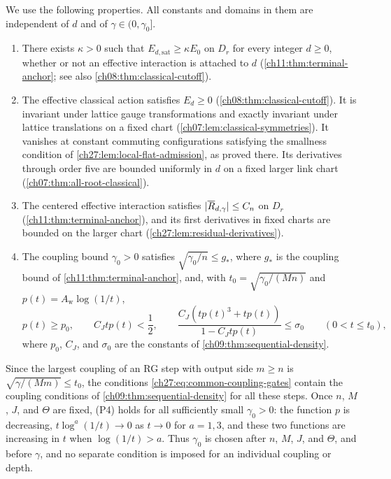 We use the following properties. All constants and domains in them are independent of $d$ and of $\gamma\in(0,\gamma_0]$.
\begin{enumerate}
\item[(P1)] There exists $\kappa>0$ such that $E_{d,\mathrm{sat}}\ge\kappa E_0$ on $D_r$ for every integer $d\ge0$, whether or not an effective interaction is attached to $d$ (\cref{ch11:thm:terminal-anchor}; see also \cref{ch08:thm:classical-cutoff}).
\item[(P2)] The effective classical action satisfies $E_d\ge0$ (\cref{ch08:thm:classical-cutoff}). It is invariant under lattice gauge transformations and exactly invariant under lattice translations on a fixed chart (\cref{ch07:lem:classical-symmetries}). It vanishes at constant commuting configurations satisfying the smallness condition of \cref{ch27:lem:local-flat-admission}, as proved there. Its derivatives through order five are bounded uniformly in $d$ on a fixed larger link chart (\cref{ch07:thm:all-root-classical}).
\item[(P3)] The centered effective interaction satisfies $\lvert \overline R_{d,\gamma}\rvert\le C_n$ on $D_r$ (\cref{ch11:thm:terminal-anchor}), and its first derivatives in fixed charts are bounded on the larger chart (\cref{ch27:lem:residual-derivatives}).
\item[(P4)] The coupling bound $\gamma_0>0$ satisfies $\sqrt{\gamma_0/n}\le g_*$, where $g_*$ is the coupling bound of \cref{ch11:thm:terminal-anchor}, and, with $t_0=\sqrt{\gamma_0/(Mn)}$ and $p(t)=A_{\mathrm w}\log(1/t)$,
\begin{equation}\label{ch27:eq:common-coupling-gates}
 p(t)\ge p_0,\qquad C_Jtp(t)<\frac12,\qquad\frac{C_J(tp(t)^3+tp(t))}{1-C_Jtp(t)}\le\sigma_0\qquad(0<t\le t_0),
\end{equation}
where $p_0$, $C_J$, and $\sigma_0$ are the constants of \cref{ch09:thm:sequential-density}.
\end{enumerate}
Since the largest coupling of an RG step with output side $m\ge n$ is $\sqrt{\gamma/(Mm)}\le t_0$, the conditions \eqref{ch27:eq:common-coupling-gates} contain the coupling conditions of \cref{ch09:thm:sequential-density} for all these steps. Once $n$, $M$, $J$, and $\Theta$ are fixed, (P4) holds for all sufficiently small $\gamma_0>0$: the function $p$ is decreasing, $t\log^a(1/t)\to0$ as $t\to0$ for $a=1,3$, and these two functions are increasing in $t$ when $\log(1/t)>a$. Thus $\gamma_0$ is chosen after $n$, $M$, $J$, and $\Theta$, and before $\gamma$, and no separate condition is imposed for an individual coupling or depth.

